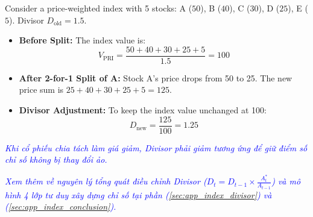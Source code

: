 \begin{tcolorbox}[
	colback=gray!5!white,
	colframe=black!15!white,
	boxrule=0.5pt,
	arc=3pt,
	title=\textbf{Example: Divisor Adjustment for Stock Splits},
	coltitle=black,
	colbacktitle=black!5!white,
	before skip=6pt,
	after skip=6pt,
	breakable
]
Consider a price-weighted index with 5 stocks: A ($50$), B ($40$), C ($30$), D ($25$), E ($5$). Divisor $D_{\text{old}} = 1.5$.
\begin{itemize}
	\item \textbf{Before Split:} The index value is:
	      \[ V_{\text{PRI}} = \frac{50+40+30+25+5}{1.5} = 100 \]
	\item \textbf{After 2-for-1 Split of A:} Stock A's price drops from 50 to 25. The new price sum is $25+40+30+25+5 = 125$.
	\item \textbf{Divisor Adjustment:} To keep the index value unchanged at 100:
	      \[ D_{\text{new}} = \frac{125}{100} = 1.25 \]
\end{itemize}

\textcolor{blue}{\textit{Khi cổ phiếu chia tách làm giá giảm, Divisor phải giảm tương ứng để giữ điểm số chỉ số không bị thay đổi ảo.}}
\end{tcolorbox}

\textcolor{blue}{\textit{Xem thêm về nguyên lý tổng quát điều chỉnh Divisor ($D_t = D_{t-1} \times \frac{A_t^*}{A_{t-1}}$) và mô hình 4 lớp tư duy xây dựng chỉ số tại phần (\ref{sec:app_index_divisor}) và (\ref{sec:app_index_conclusion}).}}


